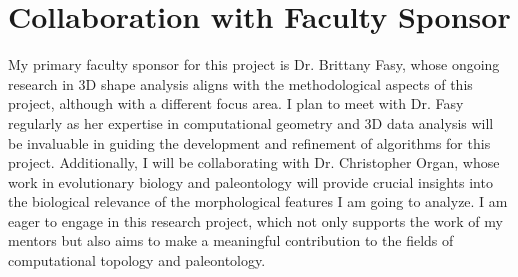 \documentclass[12pt]{article}
\begin{document}
\section{Collaboration with Faculty Sponsor}
My primary faculty sponsor for this project is Dr. Brittany Fasy, whose ongoing
research in 3D shape analysis aligns with the methodological aspects of this
project, although with a different focus area. I plan to meet with Dr. Fasy
regularly as her expertise in computational geometry and 3D data analysis will
be invaluable in guiding the development and refinement of algorithms for this
project. Additionally, I will be collaborating with Dr. Christopher Organ, whose
work in evolutionary biology and paleontology will provide crucial insights into
the biological relevance of the morphological features I am going to analyze. I am
eager to engage in this research project, which not only supports the work of my
mentors but also aims to make a meaningful contribution to the fields of
computational topology and paleontology.

\newpage

 
\end{document}
